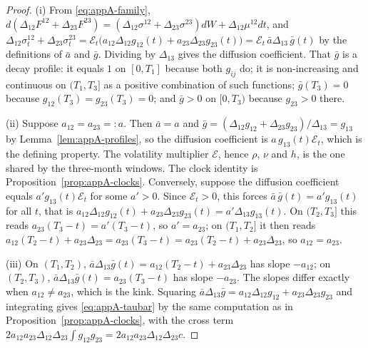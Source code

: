 \documentclass[../../main.tex]{subfiles}
\begin{document}
\begin{proof}
(i) From \eqref{eq:appA-family}, $d(\Delta_{12}F^{12}+\Delta_{23}F^{23})=(\Delta_{12}\sigma^{12}+\Delta_{23}\sigma^{23})dW+\Delta_{12}\mu^{12}dt$, and $\Delta_{12}\sigma^{12}_t+\Delta_{23}\sigma^{23}_t=\mathcal E_t\big(a_{12}\Delta_{12}g_{12}(t)+a_{23}\Delta_{23}g_{23}(t)\big)=\mathcal E_t\,\bar a\Delta_{13}\,\bar g(t)$ by the definitions of $\bar a$ and $\bar g$. Dividing by $\Delta_{13}$ gives the diffusion coefficient. That $\bar g$ is a decay profile: it equals $1$ on $[0,T_1]$ because both $g_{ij}$ do; it is non-increasing and continuous on $(T_1,T_3]$ as a positive combination of such functions; $\bar g(T_3)=0$ because $g_{12}(T_3)=g_{23}(T_3)=0$; and $\bar g>0$ on $[0,T_3)$ because $g_{23}>0$ there.

(ii) Suppose $a_{12}=a_{23}=:a$. Then $\bar a=a$ and $\bar g=(\Delta_{12}g_{12}+\Delta_{23}g_{23})/\Delta_{13}=g_{13}$ by Lemma~\ref{lem:appA-profiles}, so the diffusion coefficient is $a\,g_{13}(t)\mathcal E_t$, which is the defining property. The volatility multiplier $\mathcal E$, hence $\rho$, $\nu$ and $h$, is the one shared by the three-month windows. The clock identity is Proposition~\ref{prop:appA-clocks}. Conversely, suppose the diffusion coefficient equals $a'g_{13}(t)\mathcal E_t$ for some $a'>0$. Since $\mathcal E_t>0$, this forces $\bar a\,\bar g(t)=a'g_{13}(t)$ for all $t$, that is $a_{12}\Delta_{12}g_{12}(t)+a_{23}\Delta_{23}g_{23}(t)=a'\Delta_{13}g_{13}(t)$. On $(T_2,T_3]$ this reads $a_{23}(T_3-t)=a'(T_3-t)$, so $a'=a_{23}$; on $(T_1,T_2]$ it then reads $a_{12}(T_2-t)+a_{23}\Delta_{23}=a_{23}(T_3-t)=a_{23}(T_2-t)+a_{23}\Delta_{23}$, so $a_{12}=a_{23}$.

(iii) On $(T_1,T_2)$, $\bar a\Delta_{13}\bar g(t)=a_{12}(T_2-t)+a_{23}\Delta_{23}$ has slope $-a_{12}$; on $(T_2,T_3)$, $\bar a\Delta_{13}\bar g(t)=a_{23}(T_3-t)$ has slope $-a_{23}$. The slopes differ exactly when $a_{12}\ne a_{23}$, which is the kink. Squaring $\bar a\Delta_{13}\bar g=a_{12}\Delta_{12}g_{12}+a_{23}\Delta_{23}g_{23}$ and integrating gives \eqref{eq:appA-taubar} by the same computation as in Proposition~\ref{prop:appA-clocks}, with the cross term $2a_{12}a_{23}\Delta_{12}\Delta_{23}\int g_{12}g_{23}=2a_{12}a_{23}\Delta_{12}\Delta_{23}c$.
\end{proof}
\end{document}
